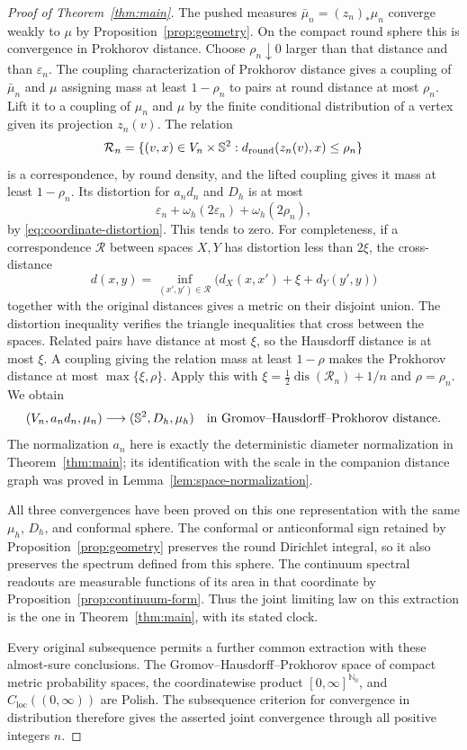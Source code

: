 \begin{proof}[Proof of Theorem~\ref{thm:main}]
The pushed measures \(\bar\mu_n=(z_n)_*\mu_n\) converge weakly to \(\mu\)
by Proposition~\ref{prop:geometry}.  On the compact round sphere this is
convergence in Prokhorov distance.  Choose \(\rho_n\downarrow0\) larger
than that distance and than \(\varepsilon_n\).  The coupling
characterization of Prokhorov distance gives a coupling of \(\bar\mu_n\)
and \(\mu\) assigning mass at least \(1-\rho_n\) to pairs at round
distance at most \(\rho_n\).  Lift it to a coupling of \(\mu_n\) and
\(\mu\) by the finite conditional distribution of a vertex given its
projection \(z_n(v)\).  The relation
\[
 \mathcal R_n=\{(v,x)\in V_n\times\mathbb S^2:
                d_{\mathrm{round}}(z_n(v),x)\le\rho_n\}
\]
is a correspondence, by round density, and the lifted coupling gives it
mass at least \(1-\rho_n\).  Its distortion for \(a_nd_n\) and \(D_h\)
is at most
\[
 \varepsilon_n+\omega_h(2\varepsilon_n)+\omega_h(2\rho_n),
\]
by \eqref{eq:coordinate-distortion}.  This tends to zero.  For completeness,
if a correspondence \(\mathcal R\) between spaces \(X,Y\) has distortion
less than \(2\xi\), the cross-distance
\[
 d(x,y)=\inf_{(x',y')\in\mathcal R}
          \bigl(d_X(x,x')+\xi+d_Y(y',y)\bigr)
\]
together with the original distances gives a metric on their disjoint
union.  The distortion inequality verifies the triangle inequalities that
cross between the spaces.  Related pairs have distance at most \(\xi\),
so the Hausdorff distance is at most \(\xi\).  A coupling giving the
relation mass at least \(1-\rho\) makes the Prokhorov distance at most
\(\max\{\xi,\rho\}\).  Apply this with
\(\xi=\tfrac12\operatorname{dis}(\mathcal R_n)+1/n\) and
\(\rho=\rho_n\).  We obtain
\[
 (V_n,a_nd_n,\mu_n)\longrightarrow(\mathbb S^2,D_h,\mu_h)
 \quad\text{in Gromov--Hausdorff--Prokhorov distance}.
\]
The normalization \(a_n\) here is exactly the deterministic diameter
normalization in Theorem~\ref{thm:main}; its identification with the scale
in the companion distance graph was proved in
Lemma~\ref{lem:space-normalization}.

All three convergences have been proved on this one representation with
the same \(\mu_h\), \(D_h\), and conformal sphere.  The conformal or
anticonformal sign retained by Proposition~\ref{prop:geometry} preserves
the round Dirichlet integral, so it also preserves the spectrum defined
from this sphere.  The continuum spectral readouts are measurable
functions of its area in that coordinate by
Proposition~\ref{prop:continuum-form}.  Thus the joint limiting law on
this extraction is the one in Theorem~\ref{thm:main}, with its stated clock.

Every original subsequence permits a further common extraction with these
almost-sure conclusions.  The Gromov--Hausdorff--Prokhorov space of compact
metric probability spaces, the coordinatewise product
\([0,\infty]^{\mathbb N_0}\), and \(C_{\mathrm{loc}}((0,\infty))\) are
Polish.  The subsequence criterion for convergence in distribution
therefore gives the asserted joint convergence through all positive
integers \(n\).
\end{proof}
